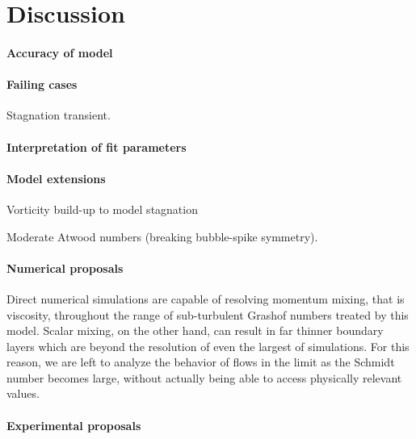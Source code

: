 \section{Discussion}

\paragraph{Accuracy of model}

\paragraph{Failing cases}
Stagnation transient.


\paragraph{Interpretation of fit parameters}

\paragraph{Model extensions}
Vorticity build-up to model stagnation

Moderate Atwood numbers (breaking bubble-spike symmetry).

\paragraph{Numerical proposals}
Direct numerical simulations are capable of resolving momentum mixing, that is viscosity, throughout the range of sub-turbulent Grashof numbers treated by this model.
Scalar mixing, on the other hand, can result in far thinner boundary layers which are beyond the resolution of even the largest of simulations.
For this reason, we are left to analyze the behavior of flows in the limit as the Schmidt number becomes large, without actually being able to access physically relevant values.




\paragraph{Experimental proposals}

